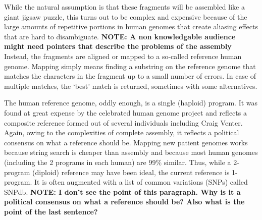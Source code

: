 \documentclass[10pt,fullpage]{article}
\begin{document}
While the natural assumption is that these fragments will be assembled
like a giant jigsaw puzzle, this turns out to be complex and expensive
because of the large amounts of repetitive portions in human genomes
that create aliasing effects that are hard to disambiguate. {\bf NOTE: A non
knowledgable audience might need pointers that describe the problems
of the assembly} Instead,
the fragments are aligned or mapped to a so-called reference human
genome.  Mapping simply means finding a substring on the reference
genome that matches the characters in the fragment up to a small
number of errors.  In case of multiple matches, the `best' match is
returned, sometimes with some alternatives.

The human reference genome, oddly enough, is a single (haploid)
program.  It was found at great expense by the celebrated human genome
project and reflects a composite reference formed out of several
individuals including Craig Venter.  Again, owing to the complexities
of complete assembly, it reflects a political consensus on what a
reference should be.  Mapping new patient genomes works because string
search is cheaper than assembly and because most human genomes
(including the 2 programs in each human) are 99\% similar.  Thus,
while a 2-program (diploid) reference may have been ideal, the current
reference is 1-program.  It is often augmented with a list of common
variations (SNPs) called SNPdb.
{\bf NOTE: I don't see the point of this paragraph. Why is it a
political consensus on what a reference should be? Also what is the
point of the last sentence?}

\newpage
\end{document}
